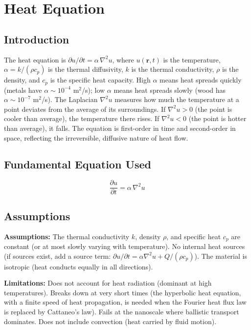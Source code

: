 \chapter{Heat Equation}

\section*{Introduction}

The heat equation is $\partial u/\partial t = \alpha\,\nabla^2 u$, where $u(\mathbf{r}, t)$ is the temperature, $\alpha = k/(\rho c_p)$ is the thermal diffusivity, $k$ is the thermal conductivity, $\rho$ is the density, and $c_p$ is the specific heat capacity. High $\alpha$ means heat spreads quickly (metals have $\alpha \sim 10^{-4}$ m$^2$/s); low $\alpha$ means heat spreads slowly (wood has $\alpha \sim 10^{-7}$ m$^2$/s). The Laplacian $\nabla^2 u$ measures how much the temperature at a point deviates from the average of its surroundings. If $\nabla^2 u > 0$ (the point is cooler than average), the temperature there rises. If $\nabla^2 u < 0$ (the point is hotter than average), it falls. The equation is first-order in time and second-order in space, reflecting the irreversible, diffusive nature of heat flow.
\section*{Fundamental Equation Used}

\[
\frac{\partial u}{\partial t}=\alpha\,\nabla^2 u
\]
\section*{Assumptions}

\textbf{Assumptions:} The thermal conductivity $k$, density $\rho$, and specific heat $c_p$ are constant (or at most slowly varying with temperature). No internal heat sources (if sources exist, add a source term: $\partial u/\partial t = \alpha\nabla^2 u + Q/(\rho c_p)$). The material is isotropic (heat conducts equally in all directions).


\textbf{Limitations:} Does not account for heat radiation (dominant at high temperatures). Breaks down at very short times (the hyperbolic heat equation, with a finite speed of heat propagation, is needed when the Fourier heat flux law is replaced by Cattaneo's law). Fails at the nanoscale where ballistic transport dominates. Does not include convection (heat carried by fluid motion).


